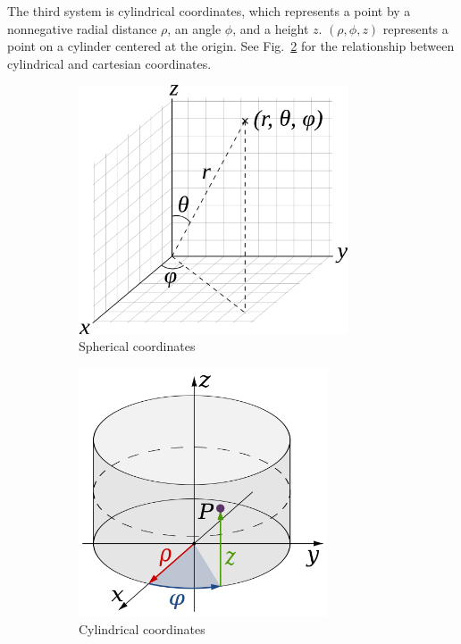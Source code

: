 \documentclass{article}
\begin{document}
\begin{enumerate}
The third system is cylindrical coordinates, which represents a point by a nonnegative radial distance $\rho$, an angle $\phi$, and a height $z$.  $(\rho, \phi, z)$ represents a point on a cylinder centered at the origin.  See Fig.~\ref{fig:cylindrical_coords} for the relationship between cylindrical and cartesian coordinates.

\begin{figure}[h!!!]
        \centering
	\begin{subfigure}[b]{0.48\textwidth}
	\centering
	\includegraphics[height=2.9in]{"./figures/spherical"}
	\caption{Spherical coordinates}
	\label{fig:spherical_coords}
	\end{subfigure}
        \quad%
	\begin{subfigure}[b]{0.48\textwidth}
	\centering
	\includegraphics[height=2.9in]{"./figures/cylindrical"}
	\caption{Cylindrical coordinates}
	\label{fig:cylindrical_coords}
	\end{subfigure}
	 \caption{}\label{fig:coord_systems}
\end{figure}


\end{enumerate}
\end{document}

